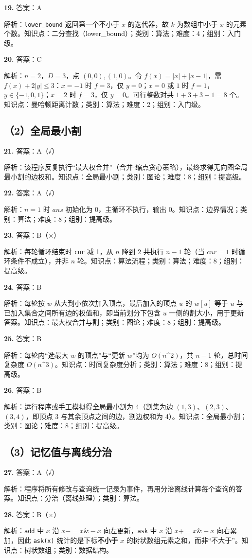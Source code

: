 \documentclass[a4paper]{ctexart}
\newcommand{\ans}[2]{\noindent\textbf{#1} \quad 答案：#2\par}
\newcommand{\expn}[1]{\hspace*{1.5em} 解析：#1\par}
\begin{document}
\ans{19.}{A}
\expn{\texttt{lower\_bound} 返回第一个不小于 $x$ 的迭代器，故 $k$ 为数组中小于 $x$ 的元素个数。\quad 知识点：二分查找（lower\_bound）；类别：算法；难度：4；组别：入门级。}

\ans{20.}{C}
\expn{$n=2$，$D=3$，点 $(0,0),(1,0)$。令 $f(x)=|x|+|x-1|$，需 $f(x)+2|y|\le 3$：$x=-1$ 时 $f=3$，仅 $y=0$；$x=0$ 或 $1$ 时 $f=1$，$y\in\{-1,0,1\}$；$x=2$ 时 $f=3$，仅 $y=0$。可行整数对共 $1+3+3+1=8$ 个。\quad 知识点：曼哈顿距离计数；类别：算法；难度：2；组别：入门级。}

\subsection*{（2）全局最小割}

\ans{21.}{A（√）}
\expn{该程序反复执行“最大权合并”（合并-缩点贪心策略），最终求得无向图全局最小割的边权和。\quad 知识点：全局最小割；类别：图论；难度：8；组别：提高级。}

\ans{22.}{A（√）}
\expn{$n=1$ 时 $ans$ 初始化为 0，主循环不执行，输出 0。\quad 知识点：边界情况；类别：算法；难度：8；组别：提高级。}

\ans{23.}{B（×）}
\expn{每轮循环结束时 \texttt{cur} 减 1，从 $n$ 降到 2 共执行 $n-1$ 轮（当 $cur=1$ 时循环条件不成立），并非 $n$ 轮。\quad 知识点：算法流程；类别：算法；难度：8；组别：提高级。}

\ans{24.}{B}
\expn{每轮按 $w$ 从大到小依次加入顶点，最后加入的顶点 $u$ 的 $w[u]$ 等于 $u$ 与已加入集合之间所有边的权值和，即当前划分下包含 $u$ 一侧的割大小，用于更新答案。\quad 知识点：最大权合并与割；类别：图论；难度：8；组别：提高级。}

\ans{25.}{B}
\expn{每轮内“选最大 $w$ 的顶点”与“更新 $w$”均为 $O(n\^{}2)$，共 $n-1$ 轮，总时间复杂度 $O(n\^{}3)$。\quad 知识点：时间复杂度分析；类别：算法；难度：8；组别：提高级。}

\ans{26.}{B}
\expn{运行程序或手工模拟得全局最小割为 4（割集为边 $(1,3)$、$(2,3)$、$(3,4)$，即顶点 3 与其余顶点之间的边，割边权和为 4）。\quad 知识点：全局最小割；类别：图论；难度：8；组别：提高级。}

\subsection*{（3）记忆值与离线分治}

\ans{27.}{A（√）}
\expn{程序将所有修改与查询统一记录为事件，再用分治离线计算每个查询的答案。\quad 知识点：分治（离线处理）；类别：算法。}

\ans{28.}{B（×）}
\expn{\texttt{add} 中 $x$ 沿 $x-=x\&-x$ 向左更新，\texttt{ask} 中 $x$ 沿 $x+=x\&-x$ 向右累加，因此 \texttt{ask(x)} 统计的是下标\textbf{不小于} $x$ 的树状数组元素之和，而非“不大于”。\quad 知识点：树状数组；类别：数据结构。}
\end{document}
